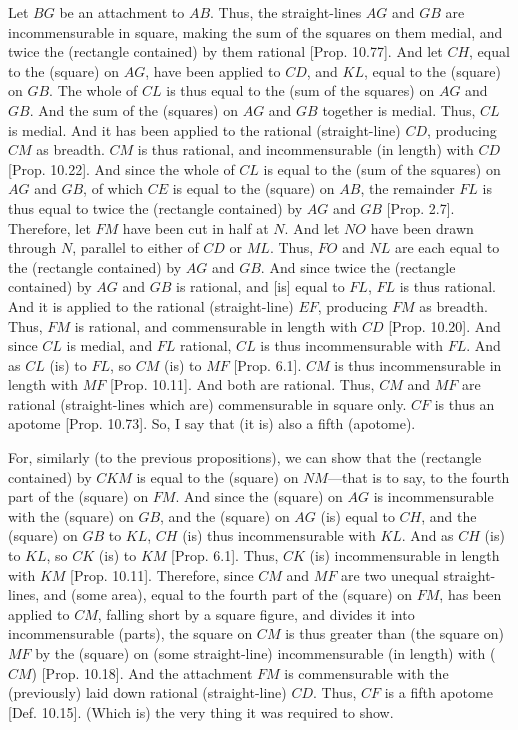 \begin{Parallel}{}{}
{Let $BG$ be an attachment to $AB$. Thus, the straight-lines $AG$
and $GB$ are incommensurable in square, making the sum of the
squares on them medial, and twice the (rectangle contained) by them
rational [Prop. 10.77]. And let $CH$, equal 
to the (square) on $AG$, have been applied to $CD$, and $KL$, equal
to the (square) on $GB$. The whole of $CL$
is thus equal to the (sum of the squares) on $AG$ and $GB$. 
And the sum of the (squares) on $AG$ and $GB$ together is medial. Thus, $CL$
is medial. And it has been applied to the rational (straight-line) $CD$,
producing $CM$ as breadth. $CM$ is thus rational, and incommensurable
(in length) with $CD$ [Prop. 10.22]. And since the whole
of $CL$ is equal to the (sum of the squares) on $AG$ and $GB$, of
which $CE$ is equal to the (square) on $AB$, the remainder $FL$ is
thus equal to twice the (rectangle contained) by $AG$ and $GB$ [Prop. 2.7]. Therefore, let $FM$ have been
cut in half at $N$. And let $NO$ have been drawn through $N$, parallel
to either of $CD$ or $ML$. Thus, $FO$ and $NL$ are each equal
to the (rectangle contained) by $AG$ and $GB$. And since twice the
(rectangle contained) by $AG$ and $GB$ is rational, and [is]
equal to $FL$, $FL$ is thus rational. And it is applied to the rational
(straight-line) $EF$, producing $FM$ as breadth. Thus, $FM$ is rational,
and commensurable in length with $CD$ [Prop. 10.20]. And since $CL$ is medial, and
$FL$ rational, $CL$ is thus incommensurable with $FL$. 
And as $CL$ (is) to $FL$, so $CM$ (is) to $MF$ [Prop. 6.1]. $CM$ is thus incommensurable in length
with $MF$ [Prop. 10.11]. And both are
rational. Thus, $CM$ and $MF$ are rational (straight-lines which are)
commensurable in square only. $CF$ is thus an apotome [Prop. 10.73].  So, I say that (it is) also
a fifth (apotome).

For, similarly (to the previous propositions), we can show that the
(rectangle contained) by $CKM$ is equal to the (square) on $NM$---that is
to say, to the fourth part of the (square) on $FM$.  And since the (square)
on $AG$ is incommensurable with the (square) on $GB$, and  the
(square) on $AG$ (is)
equal to $CH$, and the (square) on $GB$ to $KL$, $CH$ (is) thus
incommensurable with $KL$. And as $CH$ (is) to $KL$, so
$CK$ (is) to $KM$ [Prop. 6.1]. 
Thus, $CK$ (is) incommensurable in length with $KM$ [Prop. 10.11]. Therefore, since $CM$ and $MF$
are two unequal straight-lines, and (some area), equal to the
fourth part of the (square) on $FM$, has been applied to $CM$, falling
short by a square figure, and divides it into incommensurable
(parts), the square on $CM$ is thus greater than (the square on) $MF$
by the (square) on (some straight-line) incommensurable (in length)
with ($CM$) [Prop. 10.18]. And the attachment
$FM$ is commensurable with the (previously) laid down
rational (straight-line) $CD$. Thus, $CF$ is a fifth apotome [Def. 10.15]. (Which is) the very thing it was required to show.}
\end{Parallel}

